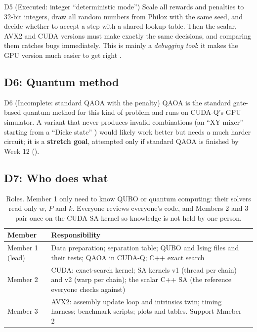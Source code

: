 \begin{decision}{D5 (Executed: integer ``deterministic mode'')}
Scale all rewards and penalties to 32-bit integers, draw all random numbers from Philox with the same seed, and decide whether to accept a step with a shared lookup table. Then the scalar, AVX2 and CUDA versions must make exactly the same decisions, and comparing them catches bugs immediately. This is mainly a \emph{debugging tool}: it makes the GPU version much easier to get right \proposed.
\end{decision}

\subsection{D6: Quantum method}

\begin{decision}{D6 (Incomplete: standard QAOA with the penalty)}
QAOA is the standard gate-based quantum method for this kind of problem and runs on CUDA-Q's GPU simulator. A variant that never produces invalid combinations (an ``XY mixer'' starting from a ``Dicke state'' \cite{hadfield2019qaoa,wang2020xy,bartschi2019dicke}) would likely work better but needs a much harder circuit; it is a \textbf{stretch goal}, attempted only if standard QAOA is finished by Week 12 ().
\end{decision}

\subsection{D7: Who does what}

\begin{table}[H]
\centering
\small
\begin{tabularx}{\linewidth}{>{\raggedright\arraybackslash}p{2.4cm}X>{\raggedright\arraybackslash}p{4.0cm}}
\toprule
Member & Responsibility\\
\midrule
Member 1 (lead) & Data preparation; separation table; QUBO and Ising files and their tests; QAOA in CUDA-Q; C++ exact search \\
Member 2 & CUDA: exact-search kernel; SA kernels v1 (thread per chain) and v2 (warp per chain); the scalar C++ SA (the reference everyone checks against) \\
Member 3 & AVX2: assembly update loop and intrinsics twin; timing harness; benchmark scripts; plots and tables. Support Mmeber 2\\
\bottomrule
\end{tabularx}
\caption{Roles. Member 1 only need to know QUBO or quantum computing: their solvers read only $w$, $P$ and $k$. Everyone reviews everyone's code, and Members 2 and 3 pair once on the CUDA SA kernel so knowledge is not held by one person.}
\label{tab:roles}
\end{table}

